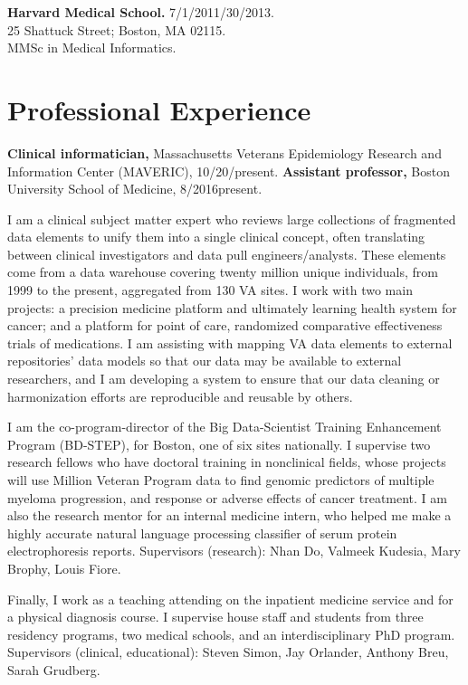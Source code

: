 \documentclass[10pt]{article}
\begin{document}
\textbf{Harvard Medical School.} 7/1/2011/30/2013.\\
25 Shattuck Street; Boston, MA 02115.\\
MMSc in Medical Informatics.

\section*{Professional Experience} %

\textbf{Clinical informatician,} Massachusetts Veterans Epidemiology
Research and Information Center (MAVERIC),
10/20/\ndash{}present. \textbf{Assistant professor,}
Boston University School of Medicine, 8/2016\ndash{}present.

I am a clinical subject matter expert who reviews large collections of
fragmented data elements to unify them into a single clinical concept,
often translating between clinical investigators and data pull
engineers/analysts. These elements come from a data warehouse covering
twenty million unique individuals, from 1999 to the present,
aggregated from 130 VA sites. I work with two main projects: a
precision medicine platform and ultimately learning health system for
cancer; and a platform for point of care, randomized comparative
effectiveness trials of medications. I am assisting with mapping VA
data elements to external repositories' data models so that our data
may be available to external researchers, and I am developing a system
to ensure that our data cleaning or harmonization efforts are
reproducible and reusable by others.

I am the co-program-director of the Big Data-Scientist Training
Enhancement Program (BD-STEP), for Boston, one of six sites
nationally. I supervise two research fellows who have doctoral
training in nonclinical fields, whose projects will use Million
Veteran Program data to find genomic predictors of multiple myeloma
progression, and response or adverse effects of cancer treatment. I am
also the research mentor for an internal medicine intern, who helped
me make a highly accurate natural language processing classifier of
serum protein electrophoresis reports. Supervisors (research): Nhan
Do, Valmeek Kudesia, Mary Brophy, Louis Fiore.

Finally, I work as a teaching attending on the inpatient medicine
service and for a physical diagnosis course. I supervise house staff
and students from three residency programs, two medical schools, and
an interdisciplinary PhD program. Supervisors (clinical, educational):
Steven Simon, Jay Orlander, Anthony Breu, Sarah Grudberg.
\end{document}
